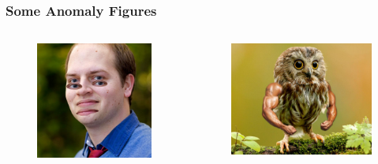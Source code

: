 \documentclass{beamer}
\begin{document}
\begin{frame}[fragile]

  \frametitle{Some Anomaly Figures}
  \begin{columns}[onlytextwidth]
  \begin{column}{.45\textwidth}
  \begin{figure}
  \includegraphics[width=\textwidth,height=0.5\textheight]{1475772_10202006969609191_901353218_n}
  \end{figure}
  \end{column}
  \hfill
  \begin{column}{.45\textwidth}
  \begin{figure}
  \includegraphics[width=\textwidth,height=0.5\textheight]{OwlWithArms}
  \end{figure}
  \end{column}
\end{columns}

\end{frame}
\end{document}
